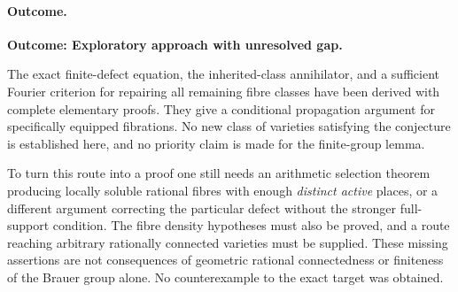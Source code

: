 \documentclass[11pt]{article}
\begin{document}
\paragraph{Outcome.}
\textbf{Outcome: Exploratory approach with unresolved gap.}

The exact finite-defect equation, the inherited-class annihilator, and a
sufficient Fourier criterion for repairing all remaining fibre classes have
been derived with complete elementary proofs.  They give a conditional
propagation argument for specifically equipped fibrations.  No new class of
varieties satisfying the conjecture is established here, and no priority claim
is made for the finite-group lemma.

To turn this route into a proof one still needs an arithmetic selection theorem
producing locally soluble rational fibres with enough \emph{distinct active}
places, or a different argument correcting the particular defect without the
stronger full-support condition.  The fibre density hypotheses must also be
proved, and a route reaching arbitrary rationally connected varieties must be
supplied.  These missing assertions are not consequences of geometric rational
connectedness or finiteness of the Brauer group alone.  No counterexample to
the exact target was obtained.
\end{document}
